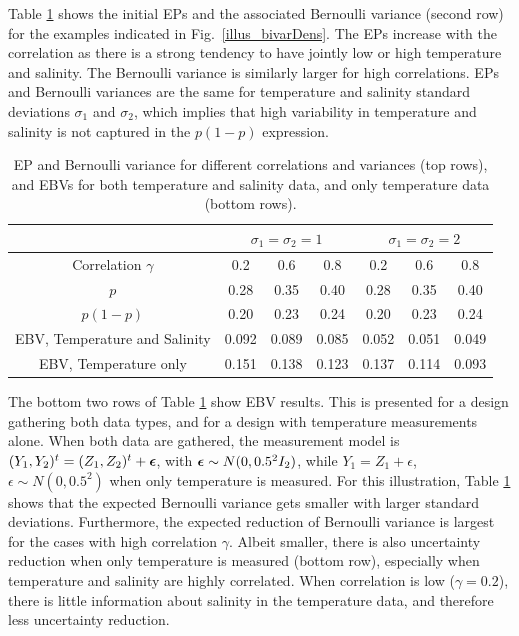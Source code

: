 \documentclass[aoas]{imsart}
\begin{document}
Table \ref{tab:sim_rhoab} shows the initial EPs and the associated
Bernoulli variance (second row) for the examples indicated in
Fig.~\ref{illus_bivarDens}. The EPs increase with the correlation as
there is a strong tendency to have jointly low or high temperature and
salinity. The Bernoulli variance is similarly larger for high
correlations. EPs and Bernoulli variances are the same for temperature
and salinity standard deviations $\sigma_1$ and $\sigma_2$, which
implies that high variability in temperature and salinity is not
captured in the $p(1-p)$ expression.

\begin{table}[!t] \centering \caption{EP and Bernoulli variance for
    different correlations and variances (top rows), and EBVs for both
    temperature and salinity data, and only temperature data (bottom
    rows).}
  \begin{tabular}{c|ccc|ccc}
 &\multicolumn{3}{c}{$\sigma_1=\sigma_2=1$} & \multicolumn{3}{c}{$\sigma_1=\sigma_2=2$} \\
\hline
Correlation $\gamma$ & 0.2 & 0.6 & 0.8 & 0.2 & 0.6 & 0.8 \\
\hline
$p$ & 0.28 & 0.35 & 0.40 & 0.28 & 0.35 & 0.40 \\ 
$p(1-p)$ & 0.20 & 0.23 & 0.24 & 0.20 & 0.23 & 0.24 \\ 
EBV, Temperature and Salinity & 0.092 & 0.089 & 0.085 & 0.052 & 0.051 & 0.049 \\ 
EBV, Temperature only & 0.151 & 0.138 & 0.123 & 0.137 & 0.114 & 0.093 \\ 
\hline
\end{tabular}
\label{tab:sim_rhoab}
\end{table}
The bottom two rows of Table \ref{tab:sim_rhoab} show EBV
results. This is presented for a design gathering both data types, and
for a design with temperature measurements alone. When both data are
gathered, the measurement model is
$(Y_1,Y_2)^t=(Z_1,Z_2)^t+{\boldsymbol \epsilon}$, with
${\boldsymbol \epsilon} \sim N(0,0.5^2I_2)$, while $Y_1=Z_1+\epsilon$,
$\epsilon \sim N(0,0.5^2)$ when only temperature is measured.  For
this illustration, Table \ref{tab:sim_rhoab} shows that the expected
Bernoulli variance gets smaller with larger standard deviations. Furthermore, the
expected reduction of Bernoulli variance is largest for the
cases with high correlation $\gamma$. Albeit smaller, there is also
uncertainty reduction when only temperature is measured (bottom row),
especially when temperature and salinity are highly correlated. When
correlation is low ($\gamma=0.2$), there is little information about
salinity in the temperature data, and therefore less uncertainty reduction.
\end{document}
